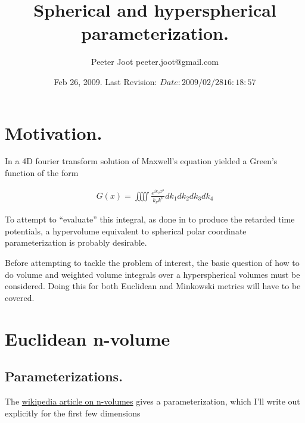 \documentclass{article}
\title{ Spherical and hyperspherical parameterization. }
\author{Peeter Joot \quad peeter.joot@gmail.com }
\date{ Feb 26, 2009.  Last Revision: $Date: 2009/02/28 16:18:57 $ }
\begin{document}
\maketitle{}
\tableofcontents

\section{ Motivation. }

In \cite{PJ4dFourier} a 4D fourier transform solution 
of Maxwell's equation yielded a Green's function of the form

\begin{align*}
G(x) = \iiiint \frac{e^{i k_\mu x^\mu}}{k_\nu k^\nu} dk_1 dk_2 dk_3 dk_4
\end{align*}

To attempt to ``evaluate'' this integral, as done in
\cite{PJpoisson}
to produce the retarded time potentials,
a hypervolume equivalent to spherical polar coordinate
parameterization is probably desirable.

Before attempting to tackle the problem of interest, the basic question
of how to do volume and weighted volume integrals over a hyperspherical volumes
must be considered.  Doing this for both Euclidean and Minkowski metrics will have to be covered.

\section{ Euclidean n-volume }

\subsection{ Parameterizations. }

The \href{http://en.wikipedia.org/wiki/Hypersphere}{wikipedia article on n-volumes} gives a parameterization, which I'll write out explicitly for the first few dimensions
\end{document}
